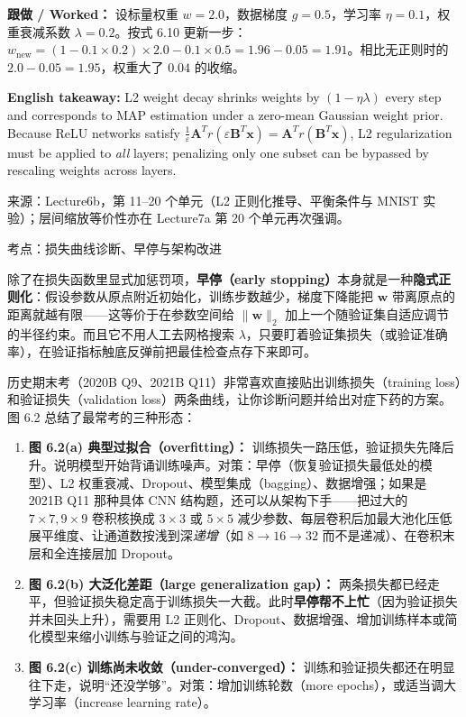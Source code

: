 \textbf{跟做 / Worked：} 设标量权重 $w=2.0$，数据梯度 $g=0.5$，学习率 $\eta=0.1$，权重衰减系数 $\lambda=0.2$。按式 6.10 更新一步：$w_{\text{new}} = (1 - 0.1\times 0.2)\times 2.0 - 0.1\times 0.5 = 1.96 - 0.05 = 1.91$。相比无正则时的 $2.0 - 0.05 = 1.95$，权重大了 $0.04$ 的收缩。

\textbf{English takeaway:} L2 weight decay shrinks weights by $(1-\eta\lambda)$ every step and corresponds to MAP estimation under a zero-mean Gaussian weight prior. Because ReLU networks satisfy $\frac{1}{\varepsilon}\mathbf{A}^T r(\varepsilon\mathbf{B}^T\mathbf{x})=\mathbf{A}^T r(\mathbf{B}^T\mathbf{x})$, L2 regularization must be applied to \emph{all} layers; penalizing only one subset can be bypassed by rescaling weights across layers.

来源：Lecture6b，第 11–20 个单元（L2 正则化推导、平衡条件与 MNIST 实验）；层间缩放等价性亦在 Lecture7a 第 20 个单元再次强调。



考点：损失曲线诊断、早停与架构改进 

除了在损失函数里显式加惩罚项，\textbf{早停（early stopping）}本身就是一种\textbf{隐式正则化}：假设参数从原点附近初始化，训练步数越少，梯度下降能把 $\mathbf{w}$ 带离原点的距离就越有限——这等价于在参数空间给 $\|\mathbf{w}\|_2$ 加上一个随验证集自适应调节的半径约束。而且它不用人工去网格搜索 $\lambda$，只要盯着验证集损失（或验证准确率），在验证指标触底反弹前把最佳检查点存下来即可。

历史期末考（2020B Q9、2021B Q11）非常喜欢直接贴出训练损失（training loss）和验证损失（validation loss）两条曲线，让你诊断问题并给出对症下药的方案。图 6.2 总结了最常考的三种形态：


\begin{enumerate}
\item \textbf{图 6.2(a) 典型过拟合（overfitting）：} 训练损失一路压低，验证损失先降后升。说明模型开始背诵训练噪声。对策：早停（恢复验证损失最低处的模型）、L2 权重衰减、Dropout、模型集成（bagging）、数据增强；如果是 2021B Q11 那种具体 CNN 结构题，还可以从架构下手——把过大的 $7\times 7, 9\times 9$ 卷积核换成 $3\times 3$ 或 $5\times 5$ 减少参数、每层卷积后加最大池化压低展平维度、让通道数按浅到深\emph{递增}（如 $8\to 16\to 32$ 而不是递减）、在卷积末层和全连接层加 Dropout。
\item \textbf{图 6.2(b) 大泛化差距（large generalization gap）：} 两条损失都已经走平，但验证损失稳定高于训练损失一大截。此时\textbf{早停帮不上忙}（因为验证损失并未回头上升），需要用 L2 正则化、Dropout、数据增强、增加训练样本或简化模型来缩小训练与验证之间的鸿沟。
\item \textbf{图 6.2(c) 训练尚未收敛（under-converged）：} 训练和验证损失都还在明显往下走，说明“还没学够”。对策：增加训练轮数（more epochs），或适当调大学习率（increase learning rate）。
\end{enumerate}

